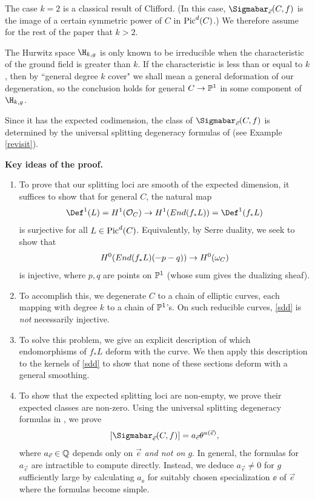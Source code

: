 The case $k = 2$ is a classical result of Clifford. (In this case, $\Sigmabar_{\vec{e}}(C, f)$ is the image of a certain symmetric power of $C$ in $\operatorname{Pic}^d(C)$.) We therefore assume for the rest of the paper that $k > 2$.
\begin{remark}
\notready
The Hurwitz space $\H_{k,g}$ is only known to be irreducible when the characteristic of the ground field is greater than $k$. If the characteristic is less than or equal to $k$, then by ``general degree $k$ cover" we shall mean a general deformation of our degeneration, so the conclusion holds for general $C \to \mathbb{P}^1$ in some component of $\H_{k,g}$.
\end{remark}

\begin{remark}
\notready
Since it has the expected codimension, the class of $\Sigmabar_{\vec{e}}(C, f)$ is determined by the universal splitting degeneracy formulas of \cite{L}
 (see  Example \ref{revisit}).
 \end{remark}




\textbf{Key ideas of the proof.}
\begin{enumerate}

\item To prove that our splitting loci are smooth of the expected dimension,
it suffices to show that for general $C$, the natural map
\[\Def^1(L) = H^1(\O_C) \rightarrow H^1(End(f_*L)) = \Def^1(f_*L)\]
is surjective for all $L \in \operatorname{Pic}^d(C)$.
Equivalently, by Serre duality, we seek to show that
\begin{equation} \label{sdd}
\source{refined-brill-noether-theory-hurwitz-spaces}
H^0(End(f_*L)(-p-q)) \to H^0(\omega_C)
\end{equation}
is injective, where $p, q$ are points on $\mathbb{P}^1$
(whose sum gives the dualizing sheaf).

\item To accomplish this, we degenerate $C$ to a chain of elliptic curves, each mapping with degree $k$ to a chain of $\mathbb{P}^1$'s.
On such reducible curves, \eqref{sdd} is \emph{not} necessarily injective.

\item To solve this problem,
we give an explicit description
of which endomorphisms of $f_* L$ deform with the curve.
We then apply this description to the kernels of \eqref{sdd} to show
that none of these sections deform with a general smoothing.

\item To show that the expected splitting loci are non-empty, we prove their expected classes are non-zero.
Using the universal splitting degeneracy formulas in \cite{L}, we prove
\[[\Sigmabar_{\vec{e}}(C, f)] = a_{\vec{e}} \theta^{u(\vec{e})},\]
where $a_{\vec{e}} \in \mathbb{Q}$ depends only on $\vec{e}$ \textit{and not on $g$}.
In general, the formulas for $a_{\vec{e}}$ are intractible to compute directly.
Instead, we deduce $a_{\vec{e}} \neq 0$ for $g$ sufficiently large by calculating $a_{\ee}$ for suitably chosen specialization $\ee$ of $\vec{e}$ where the formulas become simple.
\end{enumerate}


